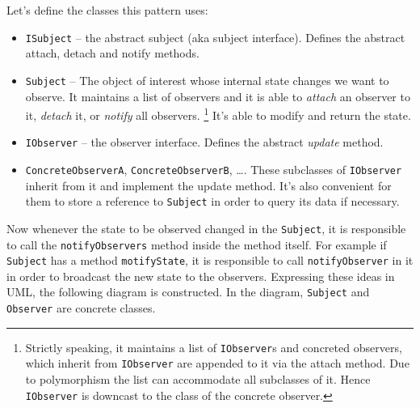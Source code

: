 \documentclass[a4paper]{article}
\begin{document}
Let's define the classes this pattern uses:
\begin{itemize}
    \item \texttt{ISubject} -- the abstract subject (aka subject interface). Defines the abstract attach, detach and notify methods.
    \item \texttt{Subject} -- The object of interest whose internal state changes we want to observe. It maintains a list of observers and it is able to \textit{attach} an observer to it,  \textit{detach} it, or \textit{notify} all observers.  \footnote{Strictly speaking, it maintains a list of \texttt{IObserver}s and concreted observers, which inherit from \texttt{IObserver} are appended to it via the attach method. Due to polymorphism the list can accommodate all subclasses of it. Hence \texttt{IObserver} is downcast to the class of the concrete observer.} It's able to modify and return the state.
    \item \texttt{IObserver} -- the observer interface. Defines the abstract \textit{update} method. 
    \item \texttt{ConcreteObserverA}, \texttt{ConcreteObserverB}, \ldots. These subclasses of \texttt{IObserver} inherit from it and implement the update method. It's also convenient for them to store a reference to \texttt{Subject} in order to query its data if necessary.
\end{itemize}

Now whenever the state to be observed changed in the \texttt{Subject}, it is responsible to call the \texttt{notifyObservers} method inside the method itself. For example if \texttt{Subject} has a method \texttt{motifyState}, it is responsible to call \texttt{notifyObserver} in it in order to broadcast the new state to the observers.
Expressing these ideas in UML, the following diagram is constructed. In the diagram, \texttt{Subject} and \texttt{Observer} are concrete classes.

\end{document}
